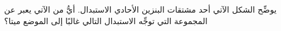 
\begin{question}

\begin{instance}

\begin{mcq}[standalone=false]

\begin{stem}
يوضِّح الشكل الآتي أحد مشتقات البنزين الأحادي الاستبدال. أيُّ من الآتي يعبر عن المجموعة  التي توجِّه الاستبدال التالي غالبًا إلى الموضع ميتا؟ \par
{}
\end{stem}

\begin{distractors}
\end{distractors}

\end{mcq}

\end{instance}

\end{question}
